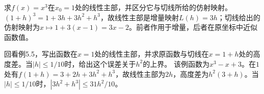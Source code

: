 求\(f(x)=x^3\)在\(x_0=1\)处的线性主部，并区分它与切线所给的仿射映射。
\solutionanswer
\((1+h)^3=1+3h+3h^2+h^3\)，故线性主部是增量映射\(L(h)=3h\)；切线给出的仿射映射为\(x\mapsto1+3(x-1)=3x-2\)。前者作用于增量，后者在原坐标中近似函数值。


回看例5.5，写出函数在\(x=1\)处的线性主部，并求原函数与切线在\(x=1+h\)处的高度差。当\(|h|\le1/10\)时，给出这个误差关于\(h^2\)的上界。
\solutionanswer
该例函数为\(x^3-x+3\)。在\(1\)处有\(f(1+h)=3+2h+3h^2+h^3\)，故线性主部为\(2h\)，高度差为\(h^2(3+h)\)。当\(|h|\le1/10\)时，\(|3h^2+h^3|\le31h^2/10\)。
\par
